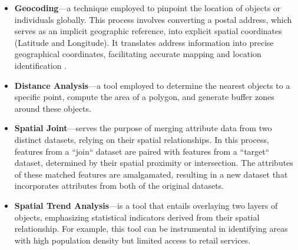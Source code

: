\begin{itemize}
    \item \textbf{Geocoding}---a technique employed to pinpoint the location of objects or individuals globally. This process involves converting a postal address, which serves as an implicit geographic reference, into explicit spatial coordinates (Latitude and Longitude). It translates address information into precise geographical coordinates, facilitating accurate mapping and location identification \cite{gis2018tools}.
    \item \textbf{Distance Analysis}---a tool employed to determine the nearest objects to a specific point, compute the area of a polygon, and generate buffer zones around these objects.
    \item \textbf{Spatial Joint}---serves the purpose of merging attribute data from two distinct datasets, relying on their spatial relationships. In this process, features from a ``join`` dataset are paired with features from a ``target`` dataset, determined by their spatial proximity or intersection. The attributes of these matched features are amalgamated, resulting in a new dataset that incorporates attributes from both of the original datasets.
    \item \textbf{Spatial Trend Analysis}---is a tool that entails overlaying two layers of objects, emphasizing statistical indicators derived from their spatial relationship. For example, this tool can be instrumental in identifying areas with high population density but limited access to retail services.
\end{itemize}